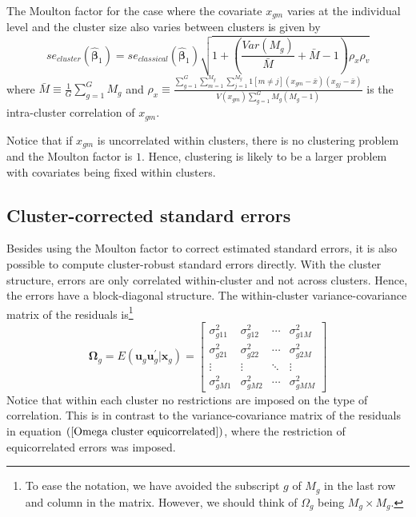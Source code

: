 \documentclass{article}
\begin{document}
The Moulton factor for the case where the covariate $x_{gm}$ varies at the
individual level and the cluster size also varies between clusters is given
by%
\begin{equation}
se_{cluster}\left( \mathbf{\hat{\beta}}_{1}\right) =se_{classical}\left( 
\mathbf{\hat{\beta}}_{1}\right) \sqrt{1+\left( \frac{Var\left( M_{g}\right) 
}{\bar{M}}+\bar{M}-1\right) \rho _{x}\rho _{v}}
\label{Standard errors and general Moulton factor}
\end{equation}%
where $\bar{M}\equiv \frac{1}{G}\sum_{g=1}^{G}M_{g}$ and $\rho _{x}\equiv 
\frac{\sum_{g=1}^{G}\sum_{m=1}^{M_{g}}\sum_{j=1}^{M_{g}}1\left[ m\neq j%
\right] \left( x_{gm}-\bar{x}\right) \left( x_{gj}-\bar{x}\right) }{V\left(
x_{gm}\right) \sum_{g=1}^{G}M_{g}\left( M_{g}-1\right) }$ is the
intra-cluster correlation of $x_{gm}$.

Notice that if $x_{gm}$ is uncorrelated within clusters, there is no
clustering problem and the Moulton factor is $1$. Hence, clustering is
likely to be a larger problem with covariates being fixed within clusters.

\subsection{Cluster-corrected standard errors}

Besides using the Moulton factor to correct estimated standard errors, it is
also possible to compute cluster-robust standard errors directly. With the
cluster structure, errors are only correlated within-cluster and not across
clusters. Hence, the errors have a block-diagonal structure. The
within-cluster variance-covariance matrix of the residuals is\footnote{%
To ease the notation, we have avoided the subscript $g$ of $M_{g}$ in the
last row and column in the matrix. However, we should think of $\Omega _{g}$
being $M_{g}\times M_{g}$.}%
\begin{equation}
\mathbf{\Omega }_{g}=E\left( \mathbf{u}_{g}\mathbf{u}_{g}^{\prime }|\mathbf{x%
}_{g}\right) =\left[ 
\begin{array}{cccc}
\sigma _{g11}^{2} & \sigma _{g12}^{2} & \cdots & \sigma _{g1M}^{2} \\ 
\sigma _{g21}^{2} & \sigma _{g22}^{2} & \cdots & \sigma _{g2M}^{2} \\ 
\vdots & \vdots & \ddots & \vdots \\ 
\sigma _{gM1}^{2} & \sigma _{gM2}^{2} & \cdots & \sigma _{gMM}^{2}%
\end{array}%
\right]  \label{Omega cluster}
\end{equation}%
Notice that within each cluster no restrictions are imposed on the type of
correlation. This is in contrast to the variance-covariance matrix of the
residuals in equation $\left( \ref{Omega cluster equicorrelated}\right) $,
where the restriction of equicorrelated errors was imposed.
\end{document}
